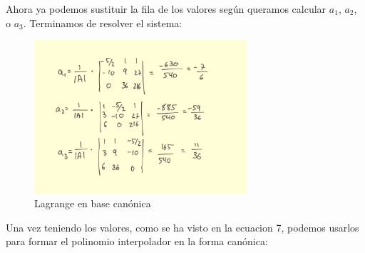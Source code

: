 \documentclass{article}
\begin{document}
Ahora ya podemos sustituir la fila de los valores según queramos calcular $a_1$, $a_2$, o $a_3$. Terminamos de resolver el sistema:

\begin{figure}[h]
  \center
  \includegraphics[width=0.7\textwidth]{src/vandermonde2_4.jpg}
  \caption{Lagrange en base canónica}
\end{figure}

Una vez teniendo los valores, como se ha visto en la ecuacion 7, podemos usarlos para formar el polinomio interpolador en la forma canónica:
\end{document}
